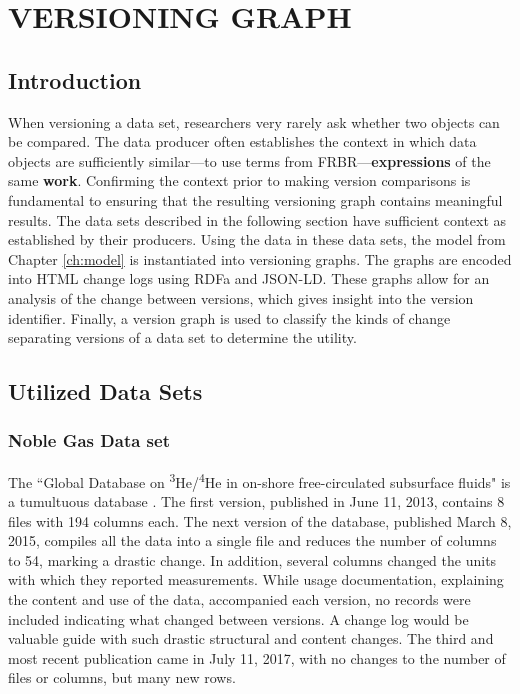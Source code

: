 
\chapter{VERSIONING GRAPH}\label{ch:graph}

\section{Introduction}

When versioning a data set, researchers very rarely ask whether two objects can be compared.
The data producer often establishes the context in which data objects are sufficiently similar---to use terms from FRBR---\textbf{expressions} of the same \textbf{work}.
Confirming the context prior to making version comparisons is fundamental to ensuring that the resulting versioning graph contains meaningful results.
The data sets described in the following section have sufficient context as established by their producers.
Using the data in these data sets, the model from Chapter \ref{ch:model} is instantiated into versioning graphs.
The graphs are encoded into HTML change logs using RDFa and JSON-LD.
These graphs allow for an analysis of the change between versions, which gives insight into the version identifier.
Finally, a version graph is used to classify the kinds of change separating versions of a data set to determine the utility.

\section{Utilized Data Sets}

\subsection{Noble Gas Data set}

The ``Global Database on \textsuperscript{3}He/\textsuperscript{4}He in on-shore free-circulated subsurface fluids" is a tumultuous database \cite{Polyak2015}.
The first version, published in June 11, 2013, contains 8 files with 194 columns each.
The next version of the database, published March 8, 2015, compiles all the data into a single file and reduces the number of columns to 54, marking a drastic change.
In addition, several columns changed the units with which they reported measurements.
While usage documentation, explaining the content and use of the data, accompanied each version, no records were included indicating what changed between versions.
A change log would be valuable guide with such drastic structural and content changes.
The third and most recent publication came in July 11, 2017, with no changes to the number of files or columns, but many new rows.

